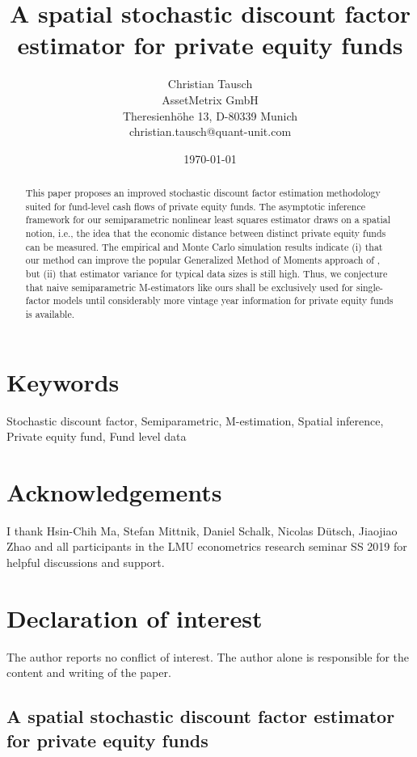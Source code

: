 \documentclass[12pt]{article}
\title{A spatial stochastic discount factor estimator for private equity funds}
\author{
	Christian Tausch  \\
	AssetMetrix GmbH  \\
	Theresienh\"{o}he 13, D-80339 Munich \\
	christian.tausch@quant-unit.com \\
	}
\date{\today}
\begin{document}
\maketitle


\section*{Keywords}
Stochastic discount factor, Semiparametric, M-estimation, Spatial inference, Private equity fund, Fund level data


\section*{Acknowledgements}
I thank Hsin-Chih Ma, Stefan Mittnik, Daniel Schalk, Nicolas D\"{u}tsch, Jiaojiao Zhao and all participants in the LMU econometrics research seminar SS 2019 for helpful discussions and support.


\section*{Declaration of interest}
The author reports no conflict of interest. 
The author alone is responsible for the content and writing of the paper.


\newpage
\doublespacing

\begin{center} 
\section*{A spatial stochastic discount factor estimator for private equity funds}
\end{center}



\begin{abstract}
This paper proposes an improved stochastic discount factor estimation methodology suited for fund-level cash flows of private equity funds.
The asymptotic inference framework for our semiparametric nonlinear least squares estimator draws on a spatial notion, i.e., the idea that the economic distance between distinct private equity funds can be measured.
The empirical and Monte Carlo simulation results indicate (i) that our method can improve the popular Generalized Method of Moments approach of \cite{DLP12}, but (ii) that estimator variance for typical data sizes is still high.
Thus, we conjecture that naive semiparametric M-estimators like ours shall be exclusively used for single-factor models until considerably more vintage year information for private equity funds is available.
\end{abstract}
\end{document}

